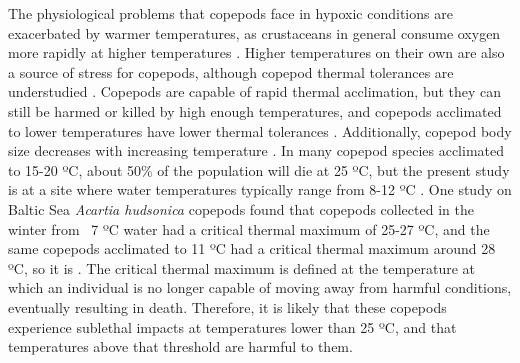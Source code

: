 \documentclass[12pt,twoside]{reedthesis}
\begin{document}
The physiological problems that copepods face in hypoxic conditions are exacerbated by warmer temperatures, as crustaceans in general consume oxygen more rapidly at higher temperatures \autocite{Vaquer-Sunyer2011}. Higher temperatures on their own are also a source of stress for copepods, although copepod thermal tolerances are understudied \autocite{Sasaki2021}. Copepods are capable of rapid thermal acclimation, but they can still be harmed or killed by high enough temperatures, and copepods acclimated to lower temperatures have lower thermal tolerances \autocite{Sasaki2021, Hahn2024}.  Additionally, copepod body size decreases with increasing temperature \autocite{Hahn2024}.  In many copepod species acclimated to 15-20 ºC, about 50\% of the population will die at 25 ºC, but the present study is at a site where water temperatures typically range from 8-12 ºC \autocite{Sasaki2019, Sunar2021, Jiang2009}. One study on Baltic Sea \textit{Acartia hudsonica} copepods found that copepods collected in the winter from ~7 ºC water had a critical thermal maximum of 25-27 ºC, and the same copepods acclimated to 11 ºC had a critical thermal maximum around 28 ºC, so it is \autocite{Hahn2024}. The critical thermal maximum is defined at the temperature at which an individual is no longer capable of moving away from harmful conditions, eventually resulting in death. Therefore, it is likely that these copepods experience sublethal impacts at temperatures lower than 25 ºC, and that temperatures above that threshold are harmful to them. 
\end{document}
